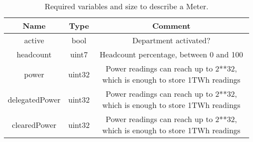 \begin{table}[H]
	\centering
	\vspace*{-1ex}
	\scriptsize
	\vspace{-1ex}
	\caption{Required variables and size to describe a Meter.}
	\begin{tabular}{|c|c|c|}
        \hline
        \textbf{Name} & \textbf{Type}  & \textbf{Comment}\\ \hline 
        active      & bool         & Department activated?\\
        headcount      & uint7         & Headcount percentage, between 0 and 100\\
        power         & uint32          & Power readings can reach up to 2**32, which is enough to store 1TWh readings \\
        delegatedPower         & uint32          & Power readings can reach up to 2**32, which is enough to store 1TWh readings \\
        clearedPower         & uint32          & Power readings can reach up to 2**32, which is enough to store 1TWh readings \\
        \hline
    \end{tabular}
    \label{table:department}
\end{table}